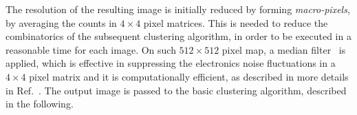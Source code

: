 The resolution of the resulting image is initially reduced by forming
\textit{macro-pixels}, by averaging the counts in $4{\times}4$ pixel
matrices. This is needed to reduce the combinatorics of the subsequent
clustering algorithm, in order to be executed in a reasonable time for
each image. On such $512{\times}512$ pixel map, a median
filter~\cite{medianfilter} is applied, which is effective in
suppressing the electronics noise fluctuations in a $4{\times}4$ pixel
matrix and it is computationally efficient, as described in more
details in Ref.~\cite{medianfilter_cygno}. The output image is passed
to the basic clustering algorithm, described in the following.


